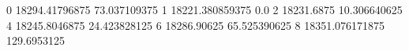 0 18294.41796875 73.037109375
1 18221.380859375 0.0
2 18231.6875 10.306640625
4 18245.8046875 24.423828125
6 18286.90625 65.525390625
8 18351.076171875 129.6953125
